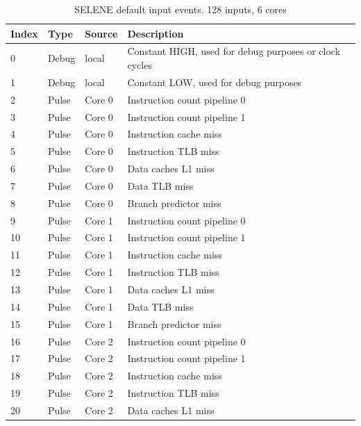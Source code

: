 \begin{table}[H]
	\caption{SELENE default input events. 128 inputs, 6 cores}
	\label{table:t_ev2}
	\centering
	\begin{tiny}
		\begin{tabular}{|l|l|l|l|l|}
			\hline
			\textbf{Index} & \textbf{Type}  & \textbf{Source} & \textbf{Description}\\
			\hline
			0 & Debug & local &  Constant HIGH, used for debug purposes or clock cycles \\
			\hline 
			1 & Debug & local &  Constant LOW, used for debug purposes \\
			\hline 
			2 & Pulse & Core 0 &  Instruction count pipeline 0 \\
			\hline 
			3 & Pulse & Core 0 &  Instruction count pipeline 1 \\
			\hline 
			4 & Pulse & Core 0 &  Instruction cache miss \\
			\hline 
			5 & Pulse & Core 0 &  Instruction TLB miss \\
			\hline 
			6 & Pulse & Core 0 &  Data caches L1 miss \\
			\hline 
			7 & Pulse & Core 0 &  Data TLB miss \\
			\hline 
			8 & Pulse & Core 0 &  Branch predictor miss \\
			\hline 
			9 & Pulse & Core 1 &  Instruction count pipeline 0 \\
			\hline 
			10 & Pulse & Core 1 &  Instruction count pipeline 1 \\
			\hline 
			11 & Pulse & Core 1 &  Instruction cache miss \\
			\hline 
			12 & Pulse & Core 1 &  Instruction TLB miss \\
			\hline 
			13 & Pulse & Core 1 &  Data caches L1 miss \\
			\hline 
			14 & Pulse & Core 1 &  Data TLB miss \\
			\hline 
			15 & Pulse & Core 1 &  Branch predictor miss \\
			\hline 
			16 & Pulse & Core 2 &  Instruction count pipeline 0 \\
			\hline 
			17 & Pulse & Core 2 &  Instruction count pipeline 1 \\
			\hline 
			18 & Pulse & Core 2 &  Instruction cache miss \\
			\hline 
			19 & Pulse & Core 2 &  Instruction TLB miss \\
			\hline 
			20 & Pulse & Core 2 &  Data caches L1 miss \\

\end{tabular}
\end{tiny}
\end{table}
